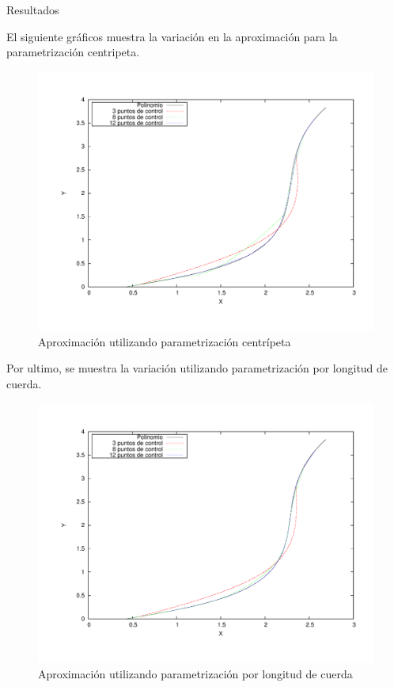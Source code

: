 \begin{section}{Resultados}
	\VSP
	
	El siguiente gráficos muestra la variación en la aproximación para la parametrización centripeta.
	
	\begin{figure}[H]
	  \centering
		\includegraphics[width=14cm]{graficos/centripetal_grafiquinSame.pdf}
	  \caption{Aproximación utilizando parametrización centrípeta}
	  \label{fig:centripetal}
	\end{figure}
	
	\VSP

	Por ultimo, se muestra la variación utilizando parametrización por longitud de cuerda.

	\begin{figure}[H]
	  \centering
		\includegraphics[width=14cm]{graficos/chordLength_grafiquinSame.pdf}
	  \caption{Aproximación utilizando parametrización por longitud de cuerda}
	  \label{fig:chordLength}
	\end{figure}
	
	\VSP
\end{section}
